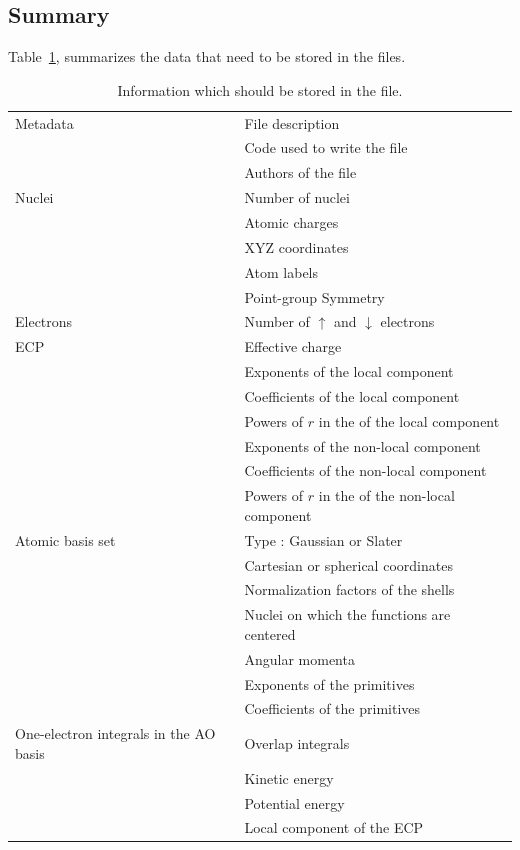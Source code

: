 \subsection{Summary}

Table~\ref{tab:data}, summarizes the data that need to be stored in
the files.
\begin{longtable}{|l|l|}
  \caption{Information which should be stored in the file.\label{tab:data}}
  \\
\hline
Metadata
& File description    \\
& Code used to write the file \\
& Authors of the file         \\
\hline
Nuclei 
& Number of nuclei \\
& Atomic charges  \\
& XYZ coordinates \\
& Atom labels \\
& Point-group Symmetry \\
\hline
Electrons
& Number of $\uparrow$ and $\downarrow$ electrons \\
\hline
\ac{ECP}
  & Effective charge \\
  & Exponents of the local component \\
  & Coefficients of the local component \\
  & Powers of $r$ in the of the local component \\
  & Exponents of the non-local component \\
  & Coefficients of the non-local component \\
  & Powers of $r$ in the of the non-local component \\
\hline
Atomic basis set
  & Type : Gaussian or Slater \\
  & Cartesian or spherical coordinates \\
  & Normalization factors of the shells \\
  & Nuclei on which the functions are centered \\
  & Angular momenta \\
  & Exponents of the primitives \\
  & Coefficients of the primitives \\
\hline
  One-electron integrals in the AO basis 
 & Overlap integrals \\
 & Kinetic energy \\
 & Potential energy \\
 & Local component of the ECP \\

\end{longtable}
